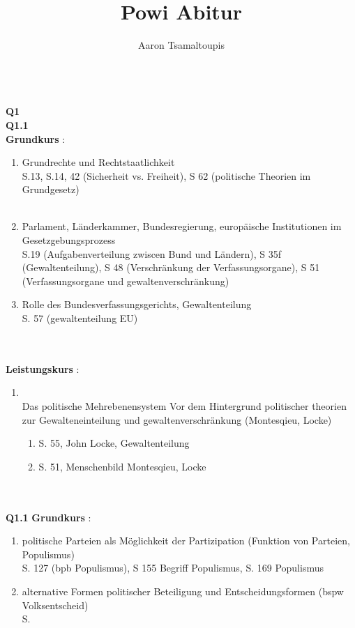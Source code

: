 \documentclass[12pt, letterpaper]{article}
\title{Powi Abitur}
\author{Aaron Tsamaltoupis}
\begin{document}
\maketitle
\tableofcontents
\newpage\\
\textbf{Q1}\\ 
\textbf{Q1.1}\\ 
\textbf{Grundkurs} :\\
\begin{enumerate}
  
  \item Grundrechte und Rechtstaatlichkeit\\S.13, S.14, 42 (Sicherheit vs. Freiheit), S 62 (politische Theorien im Grundgesetz)\\\\
  \item Parlament, Länderkammer, Bundesregierung, europäische Institutionen im Gesetzgebungsprozess\\ S.19 (Aufgabenverteilung zwiscen Bund und Ländern), S 35f (Gewaltenteilung), 
    S 48 (Verschränkung der Verfassungsorgane), S 51 (Verfassungsorgane und gewaltenverschränkung)
  \item Rolle des Bundesverfassungsgerichts, Gewaltenteilung\\
    S. 57 (gewaltenteilung EU)

\end{enumerate}
\\\\
\textbf{Leistungskurs} :
\begin{enumerate}
  
  \item \\Das politische Mehrebenensystem Vor dem Hintergrund politischer theorien zur Gewalteneinteilung und gewaltenverschränkung (Montesqieu, Locke)\\ 
\begin{enumerate}
  \item S. 55, John Locke, Gewaltenteilung
  \item S. 51, Menschenbild Montesqieu, Locke
\end{enumerate}
\end{enumerate}
\\\\
\textbf{Q1.1} 
\textbf{Grundkurs} :\\
\begin{enumerate}
  \item politische Parteien als Möglichkeit der Partizipation (Funktion von Parteien, Populismus)\\
    S. 127 (bpb Populismus), S 155 Begriff Populismus, S. 169 Populismus
  \item alternative Formen politischer Beteiligung und Entscheidungsformen (bspw Volksentscheid)\\
    S. 
\end{enumerate}
\end{document}
